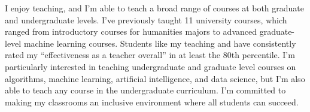 \documentclass[12pt]{article}
\begin{document}


\noindent
I enjoy teaching,
and I'm able to teach a broad range of courses at both graduate and undergraduate levels.
I've previously taught 11 university courses,
which ranged from introductory courses for humanities majors to advanced graduate-level machine learning courses.
Students like my teaching and have consistently rated my ``effectiveness as a teacher overall'' in at least the 80th percentile.
I'm particularly interested in teaching undergraduate and graduate level courses on algorithms, machine learning, artificial intelligence, and data science,
but I'm also able to teach any course in the undergraduate curriculum.
I'm committed to making my classrooms an inclusive environment where all students can succeed.
\end{document}
